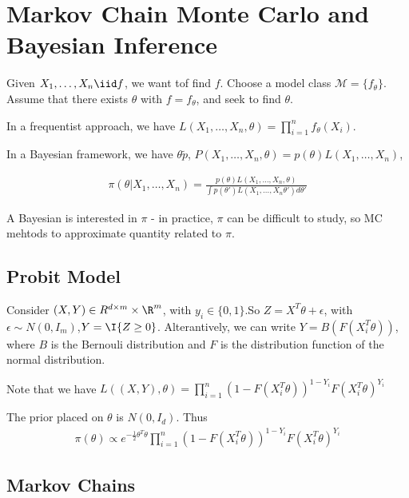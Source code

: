 \section{Markov Chain Monte Carlo and Bayesian Inference}
\label{sec:markov-chain-monte}

Given $X_{1}, \dots, X_{n} \iid f$, we want tof find $f$.  Choose a
model class $\mathcal{M} = \{ f_{\theta} \}$.  Assume that there
exists $\theta$ with $f = f_{\theta}$, and seek to find $\theta$.

In a frequentist approach, we have $L(X_{1}, \dots, X_{n}, \theta) =
\prod_{i=1}^{n} f_{\theta}(X_{i})$.

In a Bayesian framework, we have $\theta \tilde p$,
$P(X_{1}, \dots, X_{n}, \theta) = p(\theta) L(X_{1}, \dots, X_{n})$,

\begin{align}
  \label{eq:71}
  \pi(\theta | X_{1}, \dots, X_{n}) = \frac{p(\theta) L(X_{1}, \dots,
    X_{n}, \theta)}{\int p(\theta') L(X_{1}, \dots, X_{n} \theta') d\theta'}
\end{align}

A Bayesian is interested in $\pi$ - in practice, $\pi$ can be
difficult to study, so MC mehtods to approximate quantity related to
$\pi$.


\subsection{Probit Model}
\label{sec:probit-model}

Consider $(X, Y) \in R^{d \times m} \times \R^{m}$, with $y_{i} \in \{
0, 1 \}$.So $Z = X^{T} \theta + \epsilon$, with $\epsilon \sim N(0,
I_{m})$,$Y = \I{Z \geq 0}$.  Alterantively, we can write $Y =
B(F(X_{i}^{T} \theta))$, where $B$ is the Bernouli distribution and
$F$ is the distribution function of the normal distribution.  

Note that we have $L((X, Y), \theta) = \prod_{i=1}^{n} (1-F(X_{i}^{T}
\theta))^{1-Y_{i}} F(X_{i}^{T} \theta)^{Y_{i}}$

The prior placed on $\theta$ is $N(0, I_{d})$.  Thus
\begin{align}
  \label{eq:71}
  \pi(\theta) \propto e^{-\frac{1}{2} \theta^{T} \theta}
  \prod_{i=1}^{n} (1-F(X_{i}^{T} \theta))^{1-Y_{i}} F(X_{i}^{T}
  \theta)^{Y_{i}}
\end{align}

\subsection{Markov Chains}
\label{sec:markov-chains}

